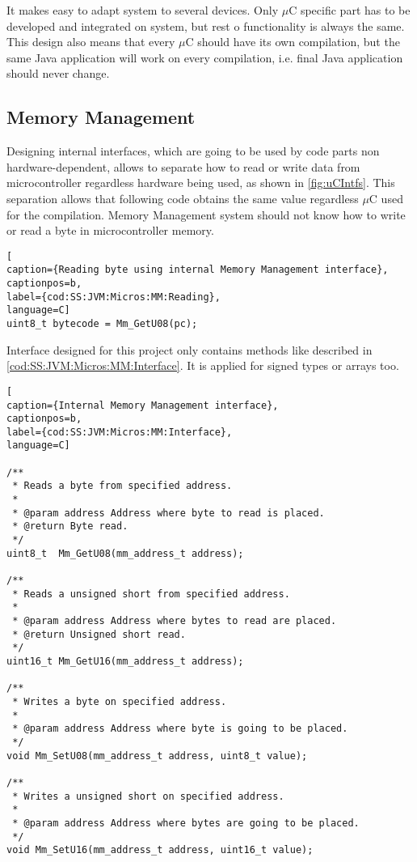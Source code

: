 It makes easy to adapt system to several devices. Only $\mu$C specific part has to be developed and integrated on system, but rest o functionality is always the same.
This design also means that every $\mu$C should have its own compilation, but the same Java application will work on every compilation, i.e. final Java application should never change.

\subsection{Memory Management}\label{SS:JVM:Micros:MM}
Designing internal interfaces, which are going to be used by code parts non hardware-dependent, allows to separate how to read or write data from microcontroller regardless hardware being used, as shown in \ref{fig:uCIntfs}. This separation allows that following code obtains the same value regardless $\mu$C used for the compilation. Memory Management system should not know how to write or read a byte in microcontroller memory.

\medskip
\begin{lstlisting}[
caption={Reading byte using internal Memory Management interface},
captionpos=b,
label={cod:SS:JVM:Micros:MM:Reading},
language=C]
uint8_t bytecode = Mm_GetU08(pc);
\end{lstlisting}
\medskip

Interface designed for this project only contains methods like described in \ref{cod:SS:JVM:Micros:MM:Interface}. It is applied for signed types or arrays too.

\medskip
\begin{lstlisting}[
caption={Internal Memory Management interface},
captionpos=b,
label={cod:SS:JVM:Micros:MM:Interface},
language=C]

/**
 * Reads a byte from specified address.
 *
 * @param address Address where byte to read is placed.
 * @return Byte read.
 */
uint8_t  Mm_GetU08(mm_address_t address);

/**
 * Reads a unsigned short from specified address.
 *
 * @param address Address where bytes to read are placed.
 * @return Unsigned short read.
 */
uint16_t Mm_GetU16(mm_address_t address);

/**
 * Writes a byte on specified address.
 *
 * @param address Address where byte is going to be placed.
 */
void Mm_SetU08(mm_address_t address, uint8_t value);

/**
 * Writes a unsigned short on specified address.
 *
 * @param address Address where bytes are going to be placed.
 */
void Mm_SetU16(mm_address_t address, uint16_t value);
\end{lstlisting}
\medskip

